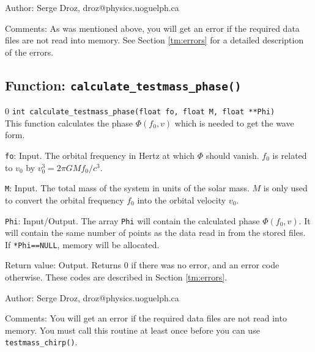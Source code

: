 \begin{description}
\item{Author:} Serge Droz, droz@physics.uoguelph.ca
\item{Comments:}
As was mentioned above, you will get an error if the required data files
are not read into memory. See Section \ref{tm:errors} for a detailed description of the errors.
\end{description}
\clearpage
%
%

\subsection{Function: {\tt calculate\_testmass\_phase()}}
\setcounter{equation}0
{\tt int calculate\_testmass\_phase(float fo, float M, float **Phi)}\\
This function calculates the phase $\Phi(f_0,v)$ which is needed to 
get the wave form. 
\begin{description}
\item{{\tt fo}}: Input. The orbital frequency in Hertz at which $\Phi$ should vanish.
             $f_0$ is related to $v_0$ by $v_0^3 = 2 \pi G M f_0 / c^3$. 
\item{{\tt M}}: Input. The total mass of the system in units of the solar
mass. $M$ is only used to convert the orbital frequency $f_0$ into the orbital
velocity $v_0$.
\item{{\tt Phi}}: Input/Output. The array {\tt *Phi} will contain the calculated
phase $\Phi(f_0,v)$. It will contain the same number of  points as
the data read in from the stored files. If {\tt **Phi==NULL},  memory will be
allocated.

\item{Return value}: Output. Returns $0$ if there was
   no error, and an error code otherwise. These codes are described in Section \ref{tm:errors}.
\end{description}
				      
\begin{description}
\item{Author:} Serge Droz, droz@physics.uoguelph.ca
\item{Comments:}
You will get an error if the required data files
are not read into memory. You must call this routine at least once before you
can use {\tt testmass\_chirp()}.
\end{description}
\clearpage
%
%

